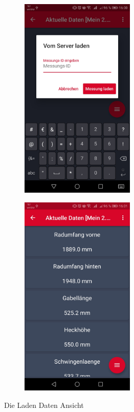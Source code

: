 		\begin{figure}[H]
	\begin{subfigure}[b]{0.5\textwidth}
		\centering
		\includegraphics[width=0.6\textwidth]{../include/images/funktionalitaet/dataLaden_fromServer}
	\end{subfigure}
	\hfill
	\begin{subfigure}[b]{0.5\textwidth}
	\centering
		\includegraphics[width=0.6\textwidth]{../include/images/funktionalitaet/dataLaden_withData}
	\end{subfigure}
	\caption{Die Laden Daten Ansicht}
\end{figure}

